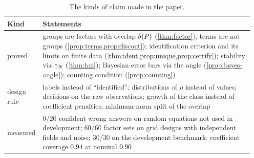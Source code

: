 \begin{table}[tbp]
\centering\small
\caption{The kinds of claim made in the paper.}\label{tab:status}
\begin{tabularx}{\linewidth}{@{}>{\raggedright\arraybackslash}p{2.2cm}X@{}}
\toprule
Kind & Statements\\
\midrule
proved & groups are factors with overlap $\delta(P)$ (\cref{thm:factor}); terms are not groups (\cref{prop:terms,prop:discont});
identification criterion and its limits on finite data (\cref{thm:ident,prop:unique,prop:certify}); stability via
$\gamma_{N}$ (\cref{thm:hm}); Bayesian error bars via the angle (\cref{prop:bayes-angle}); counting condition (\cref{prop:counting})\\
design rule & labels instead of ``identified''; distributions of $\rho$ instead of values; decisions on the raw observations;
growth of the class instead of coefficient penalties; minimum-norm split of the overlap\\
measured & $0/20$ confident wrong answers on random equations not used in development; $60/60$ factor sets on grid
designs with independent fields and noise; $30/30$ on the development benchmark; coefficient coverage $0.94$ at
nominal $0.90$\\
\bottomrule
\end{tabularx}
\end{table}
